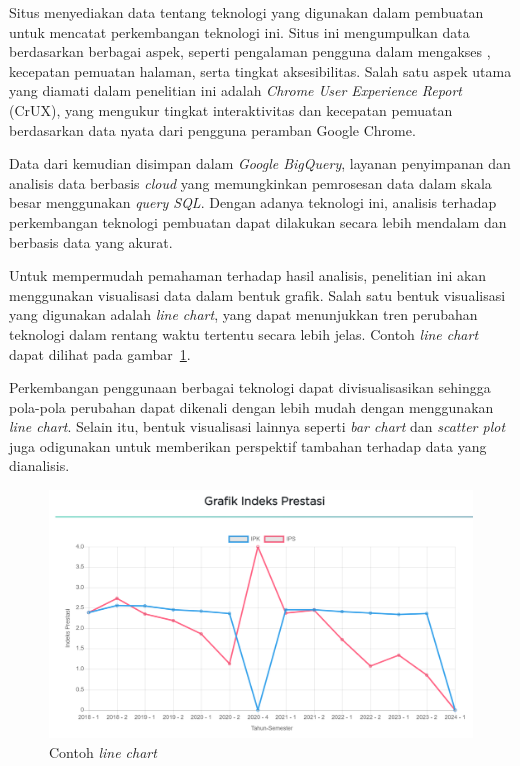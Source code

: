 Situs \http menyediakan data tentang teknologi yang digunakan dalam pembuatan \web untuk mencatat perkembangan teknologi ini. Situs ini mengumpulkan data berdasarkan berbagai aspek, seperti pengalaman pengguna dalam mengakses \web, kecepatan pemuatan halaman, serta tingkat aksesibilitas. Salah satu aspek utama yang diamati dalam penelitian ini adalah \textit{Chrome User Experience Report} (CrUX), yang mengukur tingkat interaktivitas dan kecepatan pemuatan \web berdasarkan data nyata dari pengguna peramban Google Chrome.

Data dari \http kemudian disimpan dalam \textit{Google BigQuery}, layanan penyimpanan dan analisis data berbasis \textit{cloud} yang memungkinkan pemrosesan data dalam skala besar menggunakan \textit{query SQL}. Dengan adanya teknologi ini, analisis terhadap perkembangan teknologi pembuatan \web dapat dilakukan secara lebih mendalam dan berbasis data yang akurat.

Untuk mempermudah pemahaman terhadap hasil analisis, penelitian ini akan menggunakan visualisasi data dalam bentuk grafik. Salah satu bentuk visualisasi yang digunakan adalah \textit{line chart}, yang dapat menunjukkan tren perubahan teknologi dalam rentang waktu tertentu secara lebih jelas. Contoh \textit{line chart} dapat dilihat pada gambar~\ref{fig:contohlinechart}.

Perkembangan penggunaan berbagai teknologi \web dapat divisualisasikan sehingga pola-pola perubahan dapat dikenali dengan lebih mudah dengan menggunakan \textit{line chart}. Selain itu, bentuk visualisasi lainnya seperti \textit{bar chart} dan \textit{scatter plot} juga odigunakan untuk memberikan perspektif tambahan terhadap data yang dianalisis.

\begin{figure}[]
        \centering
        \includegraphics[width=0.5\linewidth]{Gambar/ContohLineChart.png}
        \caption{Contoh \textit{line chart}}
        \label{fig:contohlinechart}
    \end{figure}

